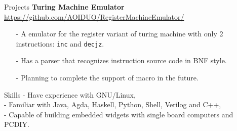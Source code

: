\documentclass{resume} %
\newcommand{\itemsepval}{-6pt}
\begin{document}
\begin{rSection}{Projects}
    \textbf{Turing Machine Emulator} \hfill \\ 
    \url{https://github.com/AOIDUO/RegisterMachineEmulator/} \hfill \par
    \begin{itemize}
        \itemsep \itemsepval {} 
        
        \item[-] A emulator for the register variant of turing machine with only 2 instructions: \texttt{inc} and \texttt{decjz}.
        \item[-] Has a parser that recognizes instruction source code in BNF style.
        \item[-] Planning to complete the support of macro in the future.
    \end{itemize}


\end{rSection} 

\begin{rSection}{Skills}
    - Have experience with GNU/Linux, \\
    - Familiar with Java, Agda, Haskell, Python, Shell, Verilog and C++, \\
    - Capable of building embedded widgets with single board computers and PCDIY.

\end{rSection} 
\end{document}

